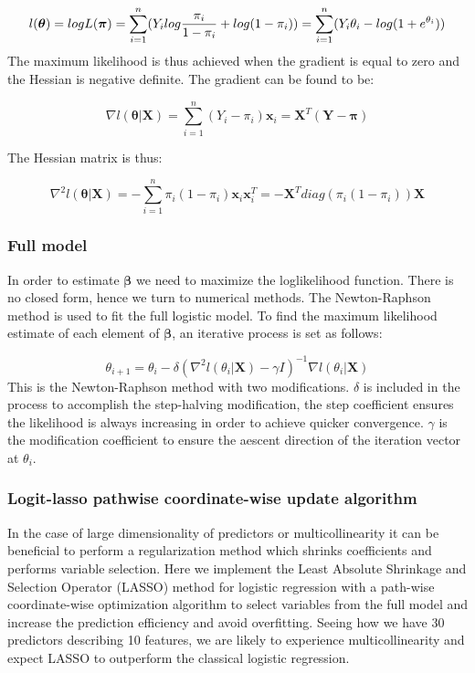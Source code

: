\documentclass[]{article}
\begin{document}
\[l(\boldsymbol\theta)=logL(\boldsymbol\pi) =\sum_{i=1}^n(Y_ilog\frac{\pi_i}{1-\pi_i}+log(1-\pi_i)) = \sum_{i=1}^n(Y_i\theta_i - log(1 + e^{\mathbf \theta_i}))\\\]
The maximum likelihood is thus achieved when the gradient is equal to
zero and the Hessian is negative definite. The gradient can be found to
be:

\[\nabla l(\boldsymbol\theta|\boldsymbol X) = \sum_{i=1}^n (Y_i - \pi_i)\boldsymbol x_i = \boldsymbol X^T(\boldsymbol Y - \boldsymbol \pi) \]

The Hessian matrix is thus:

\[\nabla^2 l(\boldsymbol\theta|\boldsymbol X) = -\sum_{i=1}^n \pi_i(1 - \pi_i)\boldsymbol x_i\boldsymbol x_i^T = -\boldsymbol X^Tdiag(\pi_i(1 - \pi_i)) \boldsymbol X\]

\hypertarget{full-model}{%
\subsubsection{Full model}\label{full-model}}

In order to estimate \(\boldsymbol \beta\) we need to maximize the
loglikelihood function. There is no closed form, hence we turn to
numerical methods. The Newton-Raphson method is used to fit the full
logistic model. To find the maximum likelihood estimate of each element
of \(\boldsymbol \beta\), an iterative process is set as follows:

\[\theta_{i+1}  = \theta_{i} -\delta (\nabla^2l(\theta_{i}|\boldsymbol X)-\gamma I)^{-1}\nabla l(\theta_{i}|\boldsymbol X) \]
This is the Newton-Raphson method with two modifications. \(\delta\) is
included in the process to accomplish the step-halving modification, the
step coefficient ensures the likelihood is always increasing in order to
achieve quicker convergence. \(\gamma\) is the modification coefficient
to ensure the aescent direction of the iteration vector at
\(\theta_{i}\).

\hypertarget{logit-lasso-pathwise-coordinate-wise-update-algorithm}{%
\subsubsection{Logit-lasso pathwise coordinate-wise update
algorithm}\label{logit-lasso-pathwise-coordinate-wise-update-algorithm}}

In the case of large dimensionality of predictors or multicollinearity
it can be beneficial to perform a regularization method which shrinks
coefficients and performs variable selection. Here we implement the
Least Absolute Shrinkage and Selection Operator (LASSO) method for
logistic regression with a path-wise coordinate-wise optimization
algorithm to select variables from the full model and increase the
prediction efficiency and avoid overfitting. Seeing how we have 30
predictors describing 10 features, we are likely to experience
multicollinearity and expect LASSO to outperform the classical logistic
regression.
\end{document}
